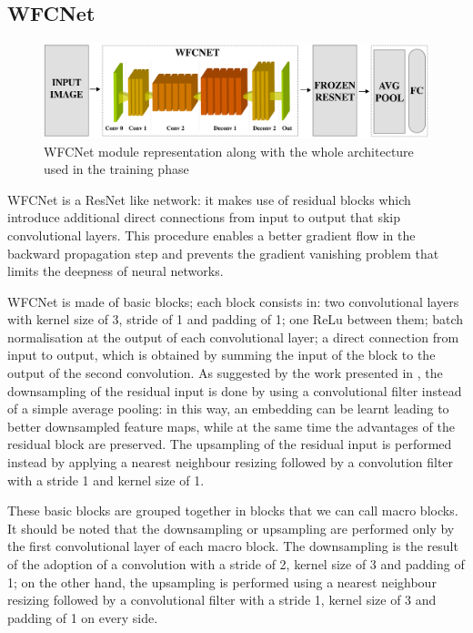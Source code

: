 \documentclass[10pt,twocolumn,letterpaper]{article}
\begin{document}
\subsection{WFCNet}

\begin{figure}[t]
	\begin{center}
		\includegraphics[width=\textwidth]{schemi/WFCNet.img.pdf}		
	\end{center}
	\caption{WFCNet module representation along with the whole architecture used in the training phase}
	\label{fig:WFCNet}
\end{figure}

WFCNet is a ResNet like network: it makes use of residual blocks which introduce additional direct connections from input to output that skip convolutional layers. This procedure enables a better gradient flow in the backward propagation step and prevents the gradient vanishing problem that limits the deepness of neural networks.

WFCNet is made of basic blocks; each block consists in: two convolutional layers with kernel size of 3, stride of 1 and padding of 1; one ReLu between them; batch normalisation at the output of each convolutional layer; a direct connection from input to output, which is obtained by summing the input of the block to the output of the second convolution.
As suggested by the work presented in \cite{springenberg2014striving}, the downsampling of the residual input is done by using a convolutional filter instead of a simple average pooling: in this way, an embedding can be learnt leading to better downsampled feature maps, while at the same time the advantages of the residual block are preserved.
The upsampling of the residual input is performed instead by applying a nearest neighbour resizing followed by a convolution filter with a stride 1 and kernel size of 1.

These basic blocks are grouped together in blocks that we can call macro blocks. It should be noted that the downsampling or upsampling are performed only by the first convolutional layer of each macro block. The downsampling is the result of the adoption of a convolution with a stride of 2, kernel size of 3 and padding of 1; on the other hand, the upsampling is performed using a nearest neighbour resizing followed by a convolutional filter with a stride 1, kernel size of 3 and padding of 1 on every side. 
\end{document}

